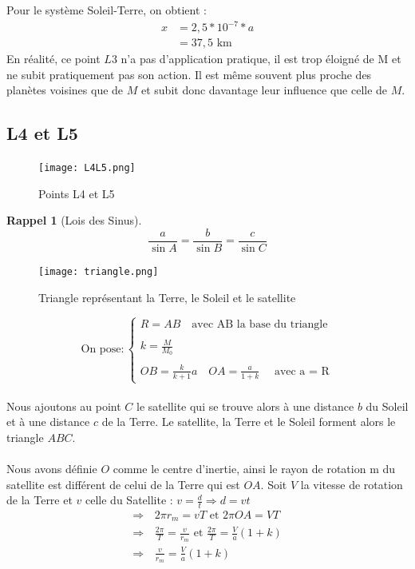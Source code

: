 \documentclass[12pt]{article}
\newtheorem*{rappel}{Rappel}
\begin{document}
Pour le système Soleil-Terre, on obtient :
\begin{align*}
x&=2,5*10^{-7} * a\\
&=37,5 \text{ km }
\end{align*}
En réalité, ce point $L3$ n'a pas d'application pratique, il est trop éloigné de M et ne subit pratiquement pas son action. Il est même souvent plus proche des planètes voisines que de $M$ et subit donc davantage leur influence que celle de $M$.
\subsection{L4 et L5}
\begin{figure}[H]
\centering
\texttt{[image: L4L5.png]}
\caption{Points L4 et L5}
\end{figure}
\begin{rappel}[Lois des Sinus]
$$\frac{a}{\sin A} = \frac{b}{\sin B} = \frac{c}{\sin C} $$
\end{rappel}
\begin{figure}[H]
\centering
\texttt{[image: triangle.png]}
\caption{Triangle représentant la Terre, le Soleil et le satellite}
\end{figure}
\[ \text{On pose} : 
\begin{cases}
R = AB \quad \text{avec AB la base du triangle} \\ \\
k = \frac{M}{M_0}\\ \\
OB = \frac{k}{k+1}a \quad OA = \frac{a}{1+k}  \quad \text{ avec a = R}
\end{cases}
\] \\
Nous ajoutons au point $C$ le satellite qui se trouve alors à une distance $b$ du Soleil et à une distance $c$ de la Terre. Le satellite, la Terre et le Soleil forment alors le triangle $ABC$.\\ \\
Nous avons définie $O$ comme le centre d'inertie, ainsi le rayon de rotation m du satellite est différent de celui de la Terre qui est $OA$.
\newpage
Soit $V$ la vitesse de rotation de la Terre et $v$ celle du Satellite : $v = \frac{d}{t} \Rightarrow \boxed{d = vt}$ 
\begin{align*}
\Rightarrow \, &2\pi r_m = vT \text{ et } 2\pi OA = VT \\
\Rightarrow \, &\frac{2\pi}{T} = \frac{v}{r_m} \text{ et } \frac{2\pi}{T} = \frac{V}{a}(1+k)\\
\Rightarrow \, &\boxed{\frac{v}{r_m} = \frac{V}{a}(1+k)} \tag{1}
\end{align*} \\
\end{document}
